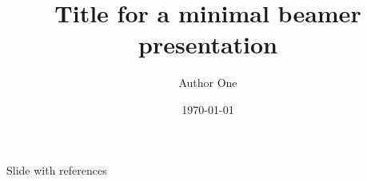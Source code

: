 \documentclass{beamer}					%
\title{Title for a minimal beamer presentation}	%
\author{Author One}								%
\institute{Name of institution}					%
\date{\today}									%
\begin{document}
\begin{frame}
  \titlepage
\end{frame}

\begin{frame}{Slide with references}
\begin{figure}
    \centering

    \makeatletter
    \resizebox{0.9\textwidth}{!}{
        
    }
    \makeatother
\end{figure}
\end{frame}
\end{document}
